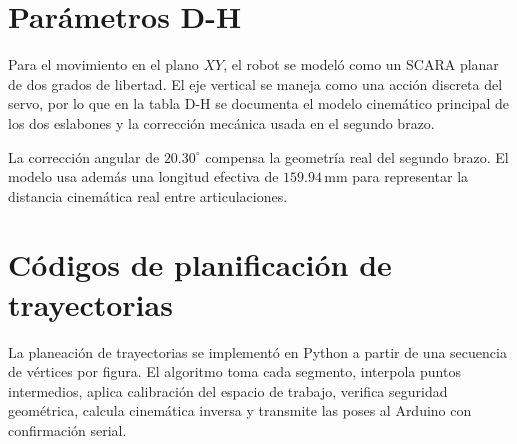 \documentclass[11pt,letterpaper,onecolumn]{article}
\begin{document}

\section{Parámetros D-H}
\justify

Para el movimiento en el plano $XY$, el robot se modeló como un SCARA planar de dos grados de libertad. El eje vertical se maneja como una acción discreta del servo, por lo que en la tabla D-H se documenta el modelo cinemático principal de los dos eslabones y la corrección mecánica usada en el segundo brazo.

\begin{table}[H]
\centering
\caption{Parámetros Denavit-Hartenberg del robot SCARA}
\renewcommand{\arraystretch}{1.2}
\end{table}

La corrección angular de $20.30^\circ$ compensa la geometría real del segundo brazo. El modelo usa además una longitud efectiva de $159.94\,\text{mm}$ para representar la distancia cinemática real entre articulaciones.



\section{Códigos de planificación de trayectorias}
\justify

La planeación de trayectorias se implementó en Python a partir de una secuencia de vértices por figura. El algoritmo toma cada segmento, interpola puntos intermedios, aplica calibración del espacio de trabajo, verifica seguridad geométrica, calcula cinemática inversa y transmite las poses al Arduino con confirmación serial.
\end{document}
